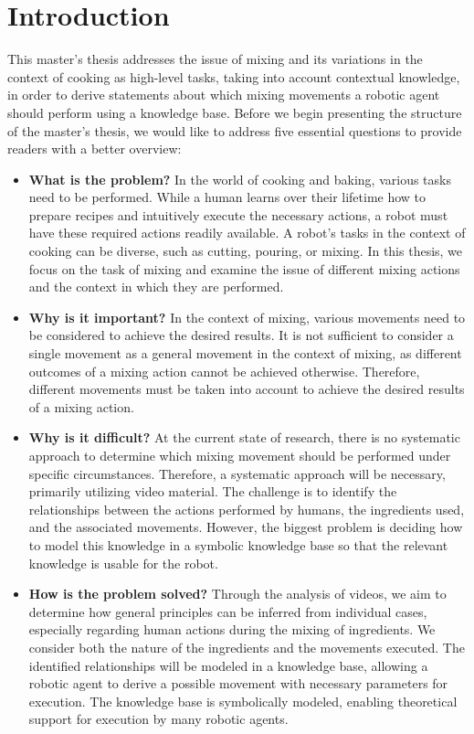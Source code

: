 \chapter*{Introduction}
This master's thesis addresses the issue of mixing and its variations in the context of cooking as high-level tasks, taking into account contextual knowledge, in order to derive statements about which mixing movements a robotic agent should perform using a knowledge base.
Before we begin presenting the structure of the master's thesis, we would like to address five essential questions to provide readers with a better overview:
\begin{itemize}
    \item \textbf{What is the problem?} In the world of cooking and baking, various tasks need to be performed. While a human learns over their lifetime how to prepare recipes and intuitively execute the necessary actions, a robot must have these required actions readily available. A robot's tasks in the context of cooking can be diverse, such as cutting, pouring, or mixing. In this thesis, we focus on the task of mixing and examine the issue of different mixing actions and the context in which they are performed.    
    \item \textbf{Why is it important?} In the context of mixing, various movements need to be considered to achieve the desired results. It is not sufficient to consider a single movement as a general movement in the context of mixing, as different outcomes of a mixing action cannot be achieved otherwise. Therefore, different movements must be taken into account to achieve the desired results of a mixing action.
    \item \textbf{Why is it difficult?} At the current state of research, there is no systematic approach to determine which mixing movement should be performed under specific circumstances. Therefore, a systematic approach will be necessary, primarily utilizing video material. The challenge is to identify the relationships between the actions performed by humans, the ingredients used, and the associated movements. However, the biggest problem is deciding how to model this knowledge in a symbolic knowledge base so that the relevant knowledge is usable for the robot.
    \item \textbf{How is the problem solved?} Through the analysis of videos, we aim to determine how general principles can be inferred from individual cases, especially regarding human actions during the mixing of ingredients. We consider both the nature of the ingredients and the movements executed. The identified relationships will be modeled in a knowledge base, allowing a robotic agent to derive a possible movement with necessary parameters for execution. The knowledge base is symbolically modeled, enabling theoretical support for execution by many robotic agents.

\end{itemize}
